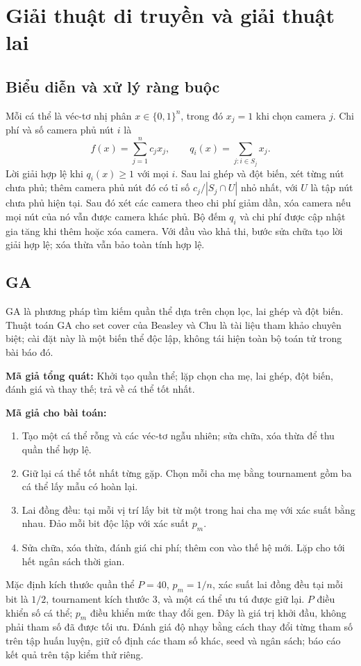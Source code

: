 
\section{Giải thuật di truyền và giải thuật lai}
\subsection{Biểu diễn và xử lý ràng buộc}
Mỗi cá thể là véc-tơ nhị phân $x\in\{0,1\}^n$, trong đó $x_j=1$ khi chọn camera $j$. Chi phí và số camera phủ nút $i$ là
\[
 f(x)=\sum_{j=1}^{n}c_jx_j,\qquad q_i(x)=\sum_{j:i\in S_j}x_j.
\]
Lời giải hợp lệ khi $q_i(x)\geq 1$ với mọi $i$. Sau lai ghép và đột biến, xét từng nút chưa phủ; thêm camera phủ nút đó có tỉ số $c_j/|S_j\cap U|$ nhỏ nhất, với $U$ là tập nút chưa phủ hiện tại. Sau đó xét các camera theo chi phí giảm dần, xóa camera nếu mọi nút của nó vẫn được camera khác phủ. Bộ đếm $q_i$ và chi phí được cập nhật gia tăng khi thêm hoặc xóa camera. Với đầu vào khả thi, bước sửa chữa tạo lời giải hợp lệ; xóa thừa vẫn bảo toàn tính hợp lệ.

\subsection{GA}
GA là phương pháp tìm kiếm quần thể dựa trên chọn lọc, lai ghép và đột biến. Thuật toán GA cho set cover của Beasley và Chu là tài liệu tham khảo chuyên biệt; cài đặt này là một biến thể độc lập, không tái hiện toàn bộ toán tử trong bài báo đó.

\noindent\textbf{Mã giả tổng quát:} Khởi tạo quần thể; lặp chọn cha mẹ, lai ghép, đột biến, đánh giá và thay thế; trả về cá thể tốt nhất.

\noindent\textbf{Mã giả cho bài toán:}
\begin{enumerate}
 \item Tạo một cá thể rỗng và các véc-tơ ngẫu nhiên; sửa chữa, xóa thừa để thu quần thể hợp lệ.
 \item Giữ lại cá thể tốt nhất từng gặp. Chọn mỗi cha mẹ bằng tournament gồm ba cá thể lấy mẫu có hoàn lại.
 \item Lai đồng đều: tại mỗi vị trí lấy bit từ một trong hai cha mẹ với xác suất bằng nhau. Đảo mỗi bit độc lập với xác suất $p_m$.
 \item Sửa chữa, xóa thừa, đánh giá chi phí; thêm con vào thế hệ mới. Lặp cho tới hết ngân sách thời gian.
\end{enumerate}
Mặc định kích thước quần thể $P=40$, $p_m=1/n$, xác suất lai đồng đều tại mỗi bit là $1/2$, tournament kích thước $3$, và một cá thể ưu tú được giữ lại. $P$ điều khiển số cá thể; $p_m$ điều khiển mức thay đổi gen. Đây là giá trị khởi đầu, không phải tham số đã được tối ưu. Đánh giá độ nhạy bằng cách thay đổi từng tham số trên tập huấn luyện, giữ cố định các tham số khác, seed và ngân sách; báo cáo kết quả trên tập kiểm thử riêng.

